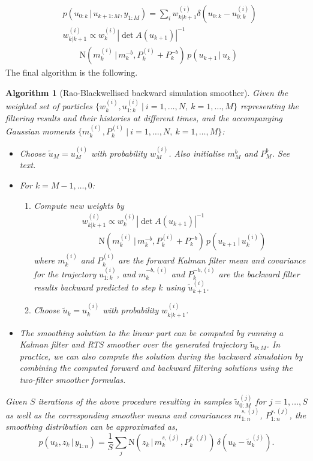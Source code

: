 \documentclass[twocolumn]{autart}    %
\newtheorem{algo}{Algorithm}[section]
\begin{document}
%
%
\begin{equation}
\begin{split}
  &p(u_{0:k}\,|\,u_{k+1:M},y_{1:M}) = \sum_i w_{k|k+1}^{(i)} \delta(u_{0:k} - u^{(i)}_{0:k}) \\
  &w_{k|k+1}^{(i)} \propto w^{(i)}_k |\det A(u_{k+1})|^{-1} \\
  & \qquad \mathrm{N}(m_k^{(i)}\,|\,m^{-b}_{k},P_k^{(i)}+P^{-b}_{k}) \, p(u_{k+1}\,|\,u_{k})
\end{split}
\label{eq:rbbacksimeq}
\end{equation}
%
The final algorithm is the following.
%
\begin{algo}[Rao-Blackwellised backward simulation smoother]
  \label{alg:rbbssmooth}
  Given the weighted set of particles $\{ w_k^{(i)}, u_{1:k}^{(i)} ~|~ i=1,\ldots,N,~k=1,\ldots,M \}$ representing the filtering results and their histories at different times, and the accompanying Gaussian moments $\{ m_k^{(i)}, P_k^{(i)} ~|~ i=1,\ldots,N,~k=1,\ldots,M \}$:
\begin{itemize}
\item Choose $\tilde{u}_M = u_M^{(i)}$ with probability $w^{(i)}_{M}$. Also initialise $m_M^b$ and $P_M^b$. See text.
\item For $k=M-1,\ldots,0$:
\begin{enumerate}
  \item Compute new weights by
    \begin{equation}
      \begin{split}
        & w_{k|k+1}^{(i)} \propto w^{(i)}_k |\det A(u_{k+1})|^{-1} \\
        & \qquad \mathrm{N}(m_k^{(i)}\,|\,m^{-b}_{k},P_k^{(i)}+P^{-b}_{k}) \, p(u_{k+1}\,|\,u_{k}^{(i)})
     \end{split}
    \end{equation}
    where $m^{(i)}_k$ and $P^{(i)}_k$ are the forward Kalman filter mean and covariance for the trajectory $u_{1:k}^{(i)}$, and     $m^{-b,(i)}_{k}$ and $P^{-b,(i)}_{k}$ are the backward filter  results backward predicted to step $k$ using $\tilde{u}_{k+1}^{(i)}$. \item Choose $\tilde{u}_k = u_k^{(i)}$ with probability $w^{(i)}_{k|k+1}$.
  \end{enumerate}
\item The smoothing solution to the linear part can be computed by running a Kalman filter and RTS smoother over the generated trajectory $\tilde{u}_{0:M}$. In practice, we can also compute the solution during the backward simulation by combining the computed forward and backward filtering solutions using the two-filter smoother formulas.
\end{itemize}
%
Given $S$ iterations of the above procedure resulting in samples $\tilde{u}_{0:M}^{(j)}$ for $j=1,\ldots,S$ as well as the corresponding smoother means and covariances $m^{s,(j)}_{1:n}$, $P^{s,(j)}_{1:n}$, the smoothing distribution can be approximated as,
%
\begin{equation}
  p(u_k,z_k\,|\,y_{1:n})
  = \frac{1}{S} \sum_j \mathrm{N}(z_k\,|\,m_k^{s,(j)},P_k^{s,(j)}) \,
  \delta(u_k - \tilde{u}_k^{(j)}).
\nonumber
\end{equation}
\end{algo}
\end{document}
